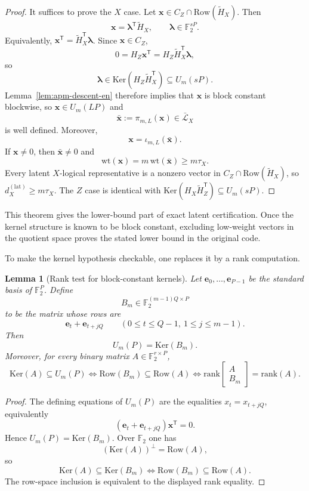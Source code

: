\documentclass[11pt]{article}
\newcommand{\Ftwo}{\mathbb{F}_2}
\newcommand{\Ker}{\mathrm{Ker}}
\newcommand{\Row}{\mathrm{Row}}
\newcommand{\rank}{\mathrm{rank}}
\newcommand{\wt}{\mathrm{wt}}
\newcommand{\Htil}{\tilde{H}}
\newcommand{\vect}[1]{\bm{#1}}
\newcommand{\vx}{\vect{x}}
\newcommand{\ve}{\vect{e}}
\newcommand{\vlambda}{\vect{\lambda}}
\theoremstyle{uprightthm}
\newtheorem{lemma}[theorem]{Lemma}
\begin{document}
\begin{proof}
It suffices to prove the $X$ case. Let $\vx\in C_Z\cap \Row(\Htil_X)$. Then
\[
\vx=\vlambda^{\mathsf T}\Htil_X,\qquad
\vlambda\in\Ftwo^{sP}.
\]
Equivalently, $\vx^{\mathsf T}=\Htil_X^{\mathsf T}\vlambda$.
Since $\vx\in C_Z$,
\[
0=H_Z\vx^{\mathsf T}
=H_Z\Htil_X^{\mathsf T}\vlambda,
\]
so
\[
\vlambda\in\Ker(H_Z\Htil_X^{\mathsf T})\subseteq U_m(sP).
\]
Lemma~\ref{lem:apm-descent-en} therefore implies that $\vx$ is block constant blockwise, so $\vx\in U_m(LP)$ and
\[
\bar{\vx}:=\pi_{m,L}(\vx)\in\bar{\mathcal L}_X
\]
is well defined. Moreover,
\[
\vx=\iota_{m,L}(\bar{\vx}).
\]
If $\vx\neq 0$, then $\bar{\vx}\neq 0$ and
\[
\wt(\vx)=m\,\wt(\bar{\vx})\ge m\tau_X.
\]
Every latent $X$-logical representative is a nonzero vector in $C_Z\cap \Row(\Htil_X)$, so $d_X^{(\mathrm{lat})}\ge m\tau_X$.
The $Z$ case is identical with $\Ker(H_X\Htil_Z^{\mathsf T})\subseteq U_m(sP)$.
\end{proof}

This theorem gives the lower-bound part of exact latent certification.  Once the
kernel structure is known to be block constant, excluding low-weight vectors in
the quotient space proves the stated lower bound in the original code.

To make the kernel hypothesis checkable, one replaces it by a rank computation.

\begin{lemma}[Rank test for block-constant kernels]
\label{lem:kernel-rank-test-en}
Let $\ve_0,\dots,\ve_{P-1}$ be the standard basis of $\Ftwo^P$. Define
\[
B_m\in\Ftwo^{(m-1)Q\times P}
\]
to be the matrix whose rows are
\[
\ve_t+\ve_{t+jQ}
\qquad
(0\le t\le Q-1,\ 1\le j\le m-1).
\]
Then
\[
U_m(P)=\Ker(B_m).
\]
Moreover, for every binary matrix $A\in\Ftwo^{r\times P}$,
\[
\Ker(A)\subseteq U_m(P)
\iff
\Row(B_m)\subseteq \Row(A)
\iff
\rank\!\begin{bmatrix}A\\ B_m\end{bmatrix}=\rank(A).
\]
\end{lemma}

\begin{proof}
The defining equations of $U_m(P)$ are the equalities $x_t=x_{t+jQ}$, equivalently
\[
(\ve_t+\ve_{t+jQ})\vx^{\mathsf T}=0.
\]
Hence $U_m(P)=\Ker(B_m)$. Over $\Ftwo$ one has
\[
(\Ker(A))^\perp=\Row(A),
\]
so
\[
\Ker(A)\subseteq \Ker(B_m)
\iff
\Row(B_m)\subseteq \Row(A).
\]
The row-space inclusion is equivalent to the displayed rank equality.
\end{proof}
\end{document}
